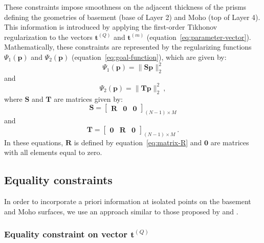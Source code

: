 \documentclass[manuscript]{geophysics}
\begin{document}
These constraints impose smoothness on the adjacent thickness of the prisms defining
the geometries of basement (base of Layer 2) and Moho (top of Layer 4). 
This information is introduced by applying the first-order Tikhonov regularization
\citep{aster-etal2005} to the vectors $\mathbf{t}^{(Q)}$ and $\mathbf{t}^{(m)}$ 
(equation~\ref{eq:parameter-vector}). 
Mathematically, these constraints are represented by the regularizing functions
$\Psi_{1}(\mathbf{p})$ and $\Psi_{2}(\mathbf{p})$ (equation~\ref{eq:goal-function}),
which are given by:
\begin{equation}
\Psi_{1}(\mathbf{p}) = \| \mathbf{S}\mathbf{p} \|_{2}^{2}
\label{eq:smootheness-contraint-basement}
\end{equation}
and 
\begin{equation}
\Psi_{2}(\mathbf{p}) = \| \mathbf{T}\mathbf{p} \|_{2}^{2} \: ,
\label{eq:smootheness-contraint-moho}
\end{equation}
where $\mathbf{S}$ and $\mathbf{T}$ are matrices given by:
\begin{equation}
\mathbf{S} = \begin{bmatrix}
\mathbf{R} & \mathbf{0} & \mathbf{0}
\end{bmatrix}_{\left( N-1 \right) \times M}
\label{eq:matrix-S}
\end{equation}
and
\begin{equation}
\mathbf{T} = \begin{bmatrix}
\mathbf{0} & \mathbf{R} & \mathbf{0}
\end{bmatrix}_{\left( N-1 \right) \times M} \: .
\label{eq:matrix-T}
\end{equation}
In these equations, $\mathbf{R}$ is defined by equation~\ref{eq:matrix-R} 
and $\mathbf{0}$ are matrices with all elements equal to zero.


\subsection{Equality constraints}

In order to incorporate a priori information at isolated points on the basement
and Moho surfaces, we use an approach similar to those proposed by
\citet{barbosa-etal1997} and \citet{barbosa-etal1999b}. 

\subsubsection*{Equality constraint on vector $\mathbf{t}^{(Q)}$}
\end{document}
